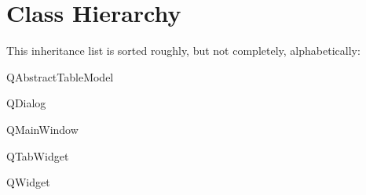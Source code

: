 \section{Class Hierarchy}
This inheritance list is sorted roughly, but not completely, alphabetically\+:\begin{DoxyCompactList}
\item {}
\item Q\+Abstract\+Table\+Model\begin{DoxyCompactList}
\item {}
\end{DoxyCompactList}
\item Q\+Dialog\begin{DoxyCompactList}
\item {}
\item {}
\item {}
\end{DoxyCompactList}
\item Q\+Main\+Window\begin{DoxyCompactList}
\item {}
\end{DoxyCompactList}
\item Q\+Tab\+Widget\begin{DoxyCompactList}
\item {}
\end{DoxyCompactList}
\item Q\+Widget\begin{DoxyCompactList}
\item {}
\end{DoxyCompactList}
\item {}
\end{DoxyCompactList}
